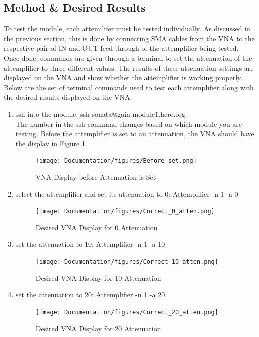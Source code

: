 \documentclass[12pt,a4paper,oneside]{article}
\begin{document}
\subsection{Method \& Desired Results}
\label{sec:8.2}

To test the module, each attemilifer must be tested individually. As discussed in the previous section, this is done by connecting SMA cables from the VNA to the respective pair of IN and OUT feed through of the attemplifier being tested. Once done, commands are given through a terminal to set the attenuation of the attemplifier to three different values. The results of these attenuation settings are displayed on the VNA and show whether the attemplifier is working properly. Below are the set of terminal commands used to test each attemplifier along with the desired results displayed on the VNA.

\begin{enumerate}
 \item ssh into the module: ssh sonata@gain-module1.hcro.org \\
  The number in the ssh command changes based on which module you are testing. Before the attemplifier is set to an attenuation, the VNA should have the display in Figure \ref{fig:Before_atten}.
  
 \begin{figure}[H]
 \centering
 \texttt{[image: Documentation/figures/Before\_set.png]}
 \caption{VNA Display before Attenuation is Set}
 \label{fig:Before_atten}
 \end{figure}
 
 \item select the attemplifier and set its attenuation to 0: Attemplifier -n 1 -a 0
 
 \begin{figure}[H]
 \centering
 \texttt{[image: Documentation/figures/Correct\_0\_atten.png]}
 \caption{Desired VNA Display for 0 Attenuation}
 \label{fig:Attenuation_0}
 \end{figure}

 \item set the attenuation to 10: Attemplifier -n 1 -a 10
 
 \begin{figure}[H]
 \centering
 \texttt{[image: Documentation/figures/Correct\_10\_atten.png]}
 \caption{Desired VNA Display for 10 Attenuation}
 \label{fig:Attenuation_10}
 \end{figure}

 \item set the attenuation to 20: Attemplifier -n 1 -a 20
 
 \begin{figure}[H]
 \centering
 \texttt{[image: Documentation/figures/Correct\_20\_atten.png]}
 \caption{Desired VNA Display for 20 Attenuation}
 \label{fig:Attenuation_20}
 \end{figure}
 
\end{enumerate}
\end{document}
